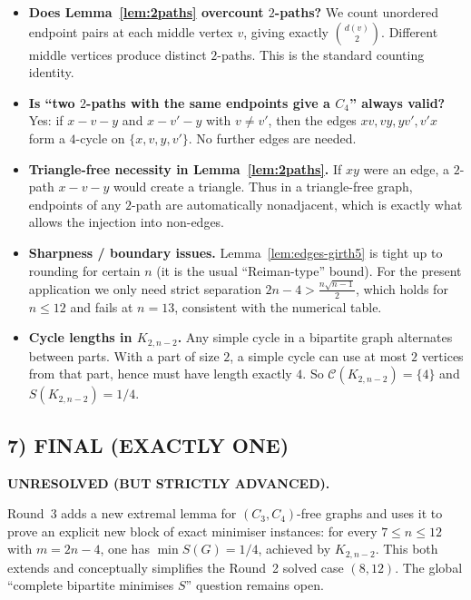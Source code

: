 \begin{itemize}
\item \textbf{Does Lemma~\ref{lem:2paths} overcount $2$-paths?}
We count unordered endpoint pairs at each middle vertex $v$, giving exactly $\binom{d(v)}{2}$.
Different middle vertices produce distinct $2$-paths. This is the standard counting identity.

\item \textbf{Is ``two $2$-paths with the same endpoints give a $C_4$'' always valid?}
Yes: if $x-v-y$ and $x-v'-y$ with $v\neq v'$, then the edges $xv,vy,yv',v'x$ form a $4$-cycle on $\{x,v,y,v'\}$.
No further edges are needed.

\item \textbf{Triangle-free necessity in Lemma~\ref{lem:2paths}.}
If $xy$ were an edge, a $2$-path $x-v-y$ would create a triangle. Thus in a triangle-free graph,
endpoints of any $2$-path are automatically nonadjacent, which is exactly what allows the injection into non-edges.

\item \textbf{Sharpness / boundary issues.}
Lemma~\ref{lem:edges-girth5} is tight up to rounding for certain $n$ (it is the usual ``Reiman-type'' bound).
For the present application we only need strict separation $2n-4>\tfrac{n\sqrt{n-1}}{2}$,
which holds for $n\le 12$ and fails at $n=13$, consistent with the numerical table.

\item \textbf{Cycle lengths in $K_{2,n-2}$.}
Any simple cycle in a bipartite graph alternates between parts. With a part of size $2$, a simple cycle can use
at most $2$ vertices from that part, hence must have length exactly $4$. So $\mathcal C(K_{2,n-2})=\{4\}$ and
$S(K_{2,n-2})=1/4$.
\end{itemize}

\subsection{7) FINAL (EXACTLY ONE)}

\textbf{UNRESOLVED (BUT STRICTLY ADVANCED).}

Round~3 adds a new extremal lemma for $(C_3,C_4)$-free graphs and uses it to prove an explicit new block
of exact minimiser instances: for every $7\le n\le 12$ with $m=2n-4$, one has $\min S(G)=1/4$, achieved by
$K_{2,n-2}$.  This both extends and conceptually simplifies the Round~2 solved case $(8,12)$.
The global ``complete bipartite minimises $S$'' question remains open.

